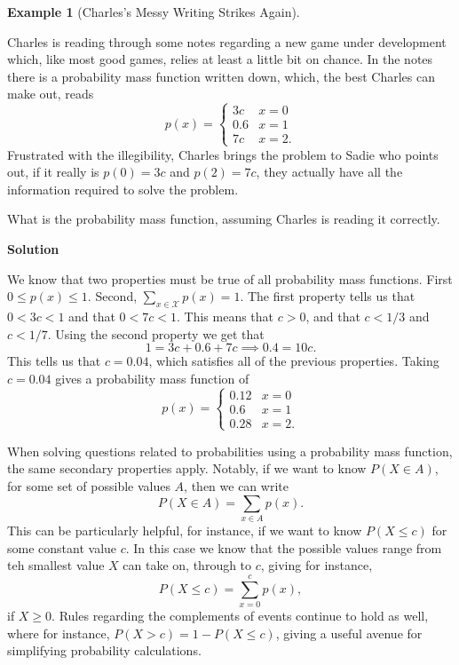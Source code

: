 \documentclass[
  letterpaper,
  DIV=11,
  numbers=noendperiod]{scrreprt}
\theoremstyle{definition}
\theoremstyle{definition}
\newtheorem{example}{Example}[chapter]
\theoremstyle{definition}
\theoremstyle{remark}
\begin{document}
\begin{example}[Charles's Messy Writing Strikes
Again]\protect\hypertarget{exm-finding-a-pmf}{}\label{exm-finding-a-pmf}

Charles is reading through some notes regarding a new game under
development which, like most good games, relies at least a little bit on
chance. In the notes there is a probability mass function written down,
which, the best Charles can make out, reads
\[p(x) = \begin{cases} 3c & x = 0 \\ 0.6 & x = 1 \\ 7c & x = 2.\end{cases}\]
Frustrated with the illegibility, Charles brings the problem to Sadie
who points out, if it really is \(p(0) = 3c\) and \(p(2) = 7c\), they
actually have all the information required to solve the problem.

What is the probability mass function, assuming Charles is reading it
correctly.

\begin{tcolorbox}[enhanced jigsaw, colback=white, colframe=quarto-callout-color-frame, arc=.35mm, leftrule=.75mm, rightrule=.15mm, opacityback=0, breakable, bottomrule=.15mm, left=2mm, toprule=.15mm]

\vspace{-3mm}\textbf{Solution}\vspace{3mm}

We know that two properties must be true of all probability mass
functions. First \(0 \leq p(x) \leq 1\). Second,
\(\sum_{x\in\mathcal{X}} p(x) = 1\). The first property tells us that
\(0 < 3c < 1\) and that \(0 < 7c < 1\). This means that \(c > 0\), and
that \(c < 1/3\) and \(c < 1/7\). Using the second property we get that
\[1 = 3c + 0.6 + 7c \implies 0.4 = 10c.\] This tells us that
\(c = 0.04\), which satisfies all of the previous properties. Taking
\(c = 0.04\) gives a probability mass function of
\[p(x) = \begin{cases} 0.12 & x = 0 \\ 0.6 & x = 1 \\ 0.28 & x = 2.\end{cases}\]

\end{tcolorbox}

\end{example}

When solving questions related to probabilities using a probability mass
function, the same secondary properties apply. Notably, if we want to
know \(P(X\in A)\), for some set of possible values \(A\), then we can
write \[P(X\in A) = \sum_{x\in A}p(x).\] This can be particularly
helpful, for instance, if we want to know \(P(X \leq c)\) for some
constant value \(c\). In this case we know that the possible values
range from teh smallest value \(X\) can take on, through to \(c\),
giving for instance, \[P(X\leq c) = \sum_{x=0}^c p(x),\] if
\(X \geq 0\). Rules regarding the complements of events continue to hold
as well, where for instance, \(P(X > c) = 1 - P(X\leq c)\), giving a
useful avenue for simplifying probability calculations.
\end{document}
